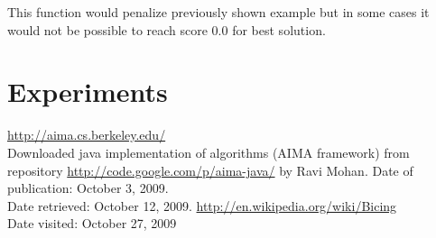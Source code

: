 \documentclass[11pt,twoside,a4paper]{mr}%
\begin{document}
This function would penalize previously shown example but in some cases it would not be possible to reach score 0.0 for best solution.


\chapter{Experiments}

\clearpage
\begin{thebibliography}{9}
		\url{http://aima.cs.berkeley.edu/} \\
		{Downloaded java implementation of algorithms (AIMA framework) from repository \url{http://code.google.com/p/aima-java/} by Ravi Mohan. Date of publication: October 3, 2009. \\
		Date retrieved: October 12, 2009. }
\url{http://en.wikipedia.org/wiki/Bicing}\\
{Date visited: October 27, 2009}


\end{thebibliography}
\end{document}
